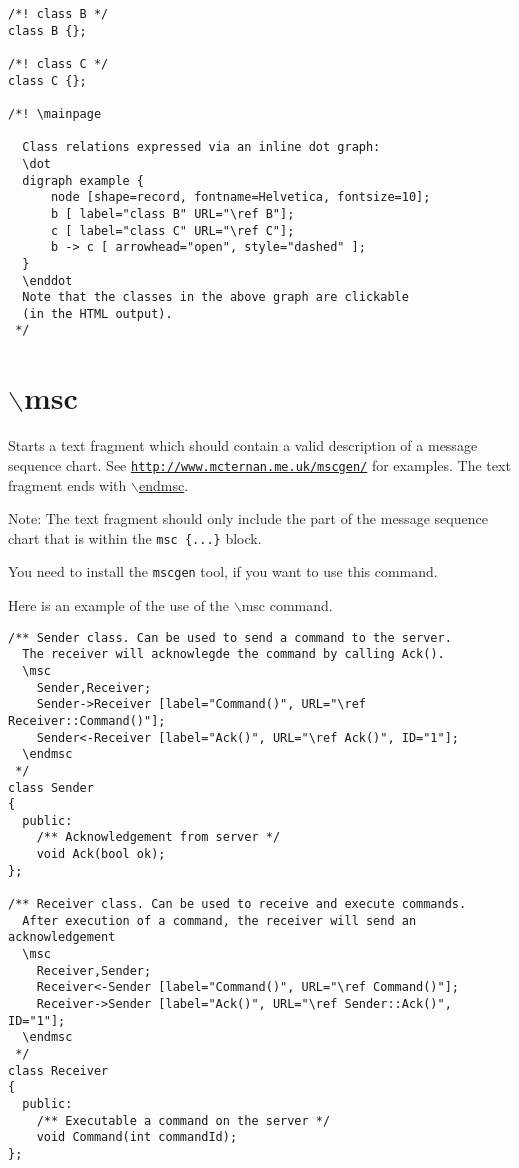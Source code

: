 \begin{Code}\begin{verbatim}/*! class B */
class B {};

/*! class C */
class C {};

/*! \mainpage

  Class relations expressed via an inline dot graph:
  \dot
  digraph example {
      node [shape=record, fontname=Helvetica, fontsize=10];
      b [ label="class B" URL="\ref B"];
      c [ label="class C" URL="\ref C"];
      b -> c [ arrowhead="open", style="dashed" ];
  }
  \enddot
  Note that the classes in the above graph are clickable 
  (in the HTML output).
 */
\end{verbatim}
\end{Code}





 \hypertarget{commands_cmdmsc}{}\section{$\backslash$msc}\label{commands_cmdmsc}
 Starts a text fragment which should contain a valid description of a message sequence chart. See \href{http://www.mcternan.me.uk/mscgen/}{\tt http://www.mcternan.me.uk/mscgen/} for examples. The text fragment ends with \hyperlink{commands_cmdendmsc}{$\backslash$endmsc}. \begin{Desc}
\item[Note:]The text fragment should only include the part of the message sequence chart that is within the {\tt msc \{...\}} block. 

You need to install the {\tt mscgen} tool, if you want to use this command.\end{Desc}
Here is an example of the use of the $\backslash$msc command. 

\begin{Code}\begin{verbatim}/** Sender class. Can be used to send a command to the server.
  The receiver will acknowlegde the command by calling Ack().
  \msc
    Sender,Receiver;
    Sender->Receiver [label="Command()", URL="\ref Receiver::Command()"];
    Sender<-Receiver [label="Ack()", URL="\ref Ack()", ID="1"];
  \endmsc
 */
class Sender
{
  public:
    /** Acknowledgement from server */
    void Ack(bool ok);
};

/** Receiver class. Can be used to receive and execute commands.
  After execution of a command, the receiver will send an acknowledgement
  \msc
    Receiver,Sender;
    Receiver<-Sender [label="Command()", URL="\ref Command()"];
    Receiver->Sender [label="Ack()", URL="\ref Sender::Ack()", ID="1"];
  \endmsc
 */
class Receiver
{
  public:
    /** Executable a command on the server */
    void Command(int commandId);
};
\end{verbatim}
\end{Code}





